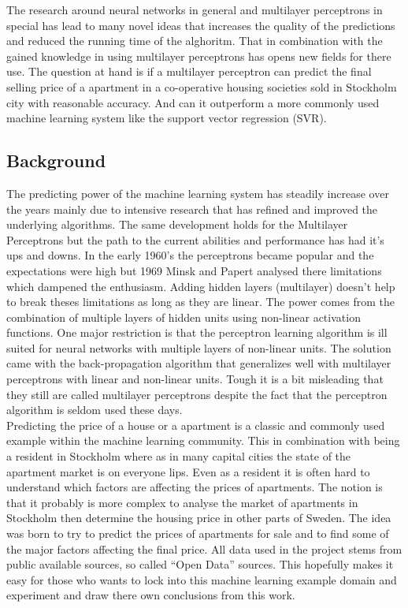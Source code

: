 
The research around neural networks in general and multilayer perceptrons in special has lead to many novel ideas that increases the quality of the predictions and reduced the running time of the alghoritm. That in combination with the gained knowledge in using multilayer perceptrons has opens new fields for there use. The question at hand is if a multilayer perceptron can predict the final selling price of a apartment in a co-operative housing societies sold in Stockholm city with reasonable accuracy. And can it outperform a more commonly used machine learning system like the support vector regression (SVR).
   

\subsection{Background}
The predicting power of the machine learning system has steadily increase over the years mainly due to intensive research that has refined and improved the underlying algorithms. The same development holds for the Multilayer Perceptrons but the path to the current abilities and performance has had it's ups and downs. In the early 1960's the perceptrons became popular and the expectations were high but 1969 Minsk and Papert analysed there limitations which dampened the enthusiasm. Adding hidden layers (multilayer) doesn't help to break theses limitations as long as they are linear. The power comes from the combination of multiple layers of hidden units using non-linear activation functions. One major restriction is that the perceptron learning algorithm is ill suited for neural networks with multiple layers of non-linear units. The solution came with the back-propagation algorithm that generalizes well with multilayer perceptrons with linear and non-linear units. Tough it is a bit misleading that they still are called multilayer perceptrons despite the fact that the perceptron algorithm is seldom used these days.
\\
Predicting the price of a house or a apartment is a classic and commonly used example within the machine learning community. This in combination with being a resident in Stockholm where as in many capital cities the state of the apartment market is on everyone lips. Even as a resident it is often hard to understand which factors are affecting the prices of apartments. The notion is that it probably is more complex to analyse the market of apartments in Stockholm then determine the housing price in other parts of Sweden. The idea was born to try to predict the prices of apartments for sale and to find some of the major factors affecting the final price. All data used in the project stems from public available sources, so called ``Open Data'' sources. This hopefully makes it easy for those who wants to lock into this machine learning example domain and experiment and draw there own conclusions from this work.
